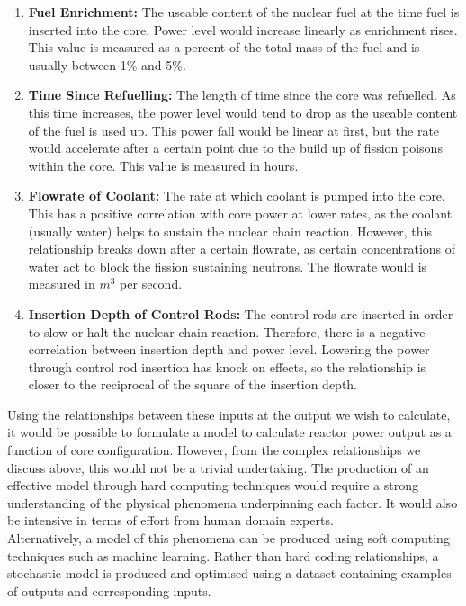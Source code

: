 \begin{enumerate}
	
	\item \textbf{Fuel Enrichment:} The useable content of the nuclear fuel at the time fuel is inserted into the core. Power level would increase linearly as enrichment rises. This value is measured as a percent of the total mass of the fuel and is usually between 1\% and 5\%.
	 
	\item \textbf{Time Since Refuelling:} The length of time since the core was refuelled. As this time increases, the power level would tend to drop as the useable content of the fuel is used up. This power fall would be linear at first, but the rate would accelerate  after a certain point due to the build up of fission poisons within the core. This value is measured in hours.
	
	\item  \textbf{Flowrate of Coolant:} The rate at which coolant is pumped into the core. This has a positive correlation with core power at lower rates, as the coolant (usually water) helps to sustain the nuclear chain reaction. However, this relationship breaks down after a certain flowrate, as certain concentrations of water act to block the fission sustaining neutrons. The flowrate would  is measured in $m^3$ per second.
	
	\item \textbf{Insertion Depth of Control Rods:} The control rods are inserted in order to slow or halt the nuclear chain reaction. Therefore, there is a negative correlation between insertion depth and power level. Lowering the power through control rod insertion has knock on effects, so the relationship is closer to the reciprocal of the square of the insertion depth.
\end{enumerate}

\noindent
Using the relationships between these inputs at the output we wish to calculate, it would be possible to formulate a model to calculate reactor power output as a function of core configuration. However, from the complex relationships we discuss above, this would not be a trivial undertaking. The production of an effective model through hard computing techniques would require a strong understanding of the physical phenomena underpinning each factor. It would also be intensive in terms of effort from human domain experts. \\

\noindent
Alternatively, a model of this phenomena can be produced using soft computing techniques \cite{ibrahim2016overview} such as machine learning. Rather than hard coding relationships, a stochastic model is produced and optimised using a dataset containing examples of outputs and corresponding inputs. \\

